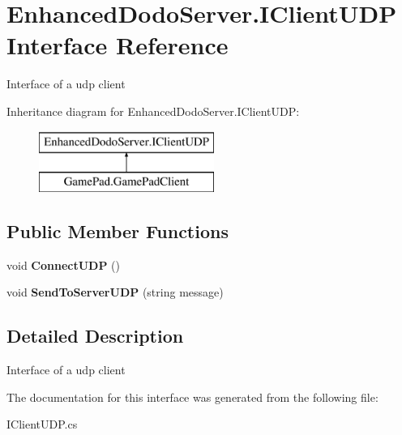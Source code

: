 \hypertarget{interface_enhanced_dodo_server_1_1_i_client_u_d_p}{}\section{Enhanced\+Dodo\+Server.\+I\+Client\+U\+DP Interface Reference}
\label{interface_enhanced_dodo_server_1_1_i_client_u_d_p}


Interface of a udp client  


Inheritance diagram for Enhanced\+Dodo\+Server.\+I\+Client\+U\+DP\+:\begin{figure}[H]
\begin{center}
\leavevmode
\includegraphics[height=2.000000cm]{interface_enhanced_dodo_server_1_1_i_client_u_d_p}
\end{center}
\end{figure}
\subsection*{Public Member Functions}
\begin{DoxyCompactItemize}
\item 
\mbox{\label{interface_enhanced_dodo_server_1_1_i_client_u_d_p_a4aba190426b3dc039ccce0bc19aff065}} 
void {\bfseries Connect\+U\+DP} ()
\item 
\mbox{\label{interface_enhanced_dodo_server_1_1_i_client_u_d_p_a9ec41db3cb1b925a02c1b250b086f049}} 
void {\bfseries Send\+To\+Server\+U\+DP} (string message)
\end{DoxyCompactItemize}


\subsection{Detailed Description}
Interface of a udp client 



The documentation for this interface was generated from the following file\+:\begin{DoxyCompactItemize}
\item 
I\+Client\+U\+D\+P.\+cs\end{DoxyCompactItemize}

